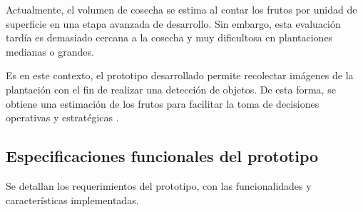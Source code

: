 Actualmente, el volumen de cosecha se estima al contar los frutos por unidad de superficie en una etapa avanzada de desarrollo. Sin embargo, esta evaluación tardía es demasiado cercana a la cosecha y muy dificultosa en plantaciones medianas o grandes.

Es en este contexto, el prototipo desarrollado permite recolectar imágenes de la plantación con el fin de realizar una detección de objetos. De esta forma, se obtiene una estimación de los frutos para facilitar la toma de decisiones operativas y estratégicas \citep{Mendoza2021}.





\subsection{Especificaciones funcionales del prototipo}
\label{requerimientos_del_sistema}

Se detallan los requerimientos del prototipo, con las funcionalidades y características implementadas.

